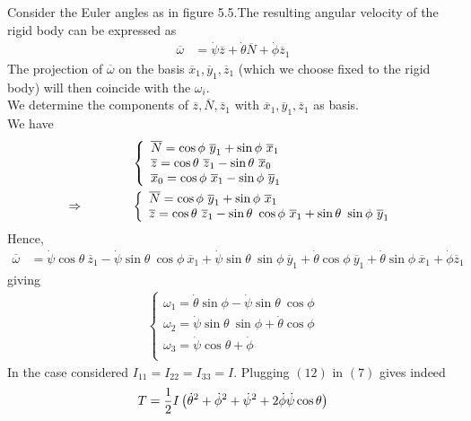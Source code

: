 Consider the Euler angles as in figure 5.5.The resulting angular velocity of the rigid body can be expressed as 
\begin{align}
\overline{\omega}&= \dot{\psi}\overline{z}+\dot{\theta}\overline{N}+\dot{\phi}\overline{z}_1
\end{align}
The projection of $\overline{\omega}$ on the basis $\overline{x}_1,\overline{y}_1,\overline{z}_1$ (which we choose fixed to the rigid body) will then coincide with the $\omega_i$.\\
We determine the components of $\overline{z},\overline{N},\overline{z}_1$ with $\overline{x}_1,\overline{y}_1,\overline{z}_1$ as basis.\\
We have
\begin{align}
& \left\{\begin{array}{l}
\overline{N}=\cos{\phi} \ \overline{y}_1+\sin{\phi} \ \overline{x}_1\\
\overline{z}= \cos{\theta} \ \overline{z}_1-\sin{\theta}\ \overline{x}_0\\
\overline{x}_0=\cos{\phi} \ \overline{x}_1-\sin{\phi} \ \overline{y}_1
\end{array}\right.\\
\Rightarrow \spatie &\left\{\begin{array}{l}
\overline{N}=\cos{\phi} \ \overline{y}_1+\sin{\phi} \ \overline{x}_1\\
\overline{z}= \cos{\theta} \ \overline{z}_1-\sin{\theta}\ \cos{\phi} \ \overline{x}_1 +\sin{\theta}\ \sin{\phi} \ \overline{y}_1
\end{array}\right.
\end{align}
Hence,
\begin{align}
 \overline{\omega}&= \dot{\psi}\cos{\theta} \ \overline{z}_1-\dot{\psi}\sin{\theta}\ \cos{\phi} \ \overline{x}_1 +\dot{\psi}\sin{\theta}\ \sin{\phi} \ \overline{y}_1+\dot{\theta}\cos{\phi} \ \overline{y}_1+\dot{\theta}\sin{\phi} \ \overline{x}_1+\dot{\phi}\overline{z}_1
\end{align}
giving
\begin{align}
\left\{\begin{array}{l}
\omega_1= \dot{\theta}\sin{\phi} -\dot{\psi}\sin{\theta}\ \cos{\phi}\\
\omega_2= \dot{\psi}\sin{\theta}\ \sin{\phi}+\dot{\theta}\cos{\phi}\\
\omega_3= \dot{\psi}\cos{\theta} +\dot{\phi}\\
\end{array}\right.
\end{align}
In the case  considered $I_{11}=I_{22}=I_{33}=I$. Plugging $(12)$ in $(7)$ gives indeed
$$T=\frac{1}{2} I\left(\dot{\theta}^2+\dot{\phi}^2+\dot{\psi}^2+2\dot{\phi}\dot{\psi}\cos{\theta} \right)$$


